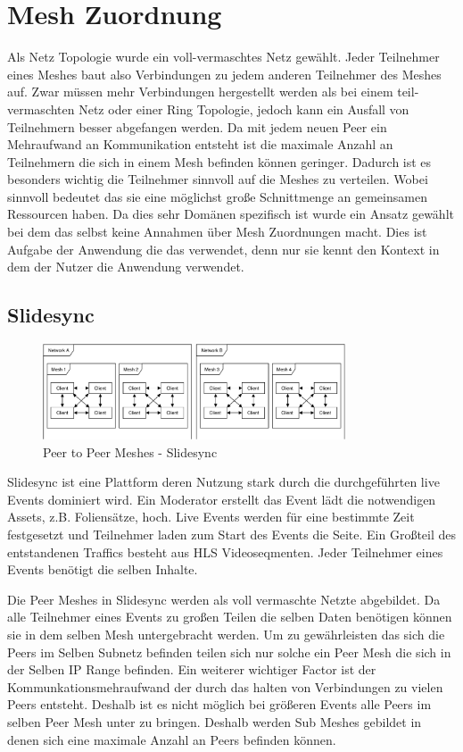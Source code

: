 \section{Mesh Zuordnung}
Als Netz Topologie wurde ein voll-vermaschtes Netz gewählt. Jeder Teilnehmer eines Meshes baut also Verbindungen zu jedem anderen Teilnehmer des Meshes auf. Zwar müssen mehr Verbindungen hergestellt werden als bei einem teil-vermaschten Netz oder einer Ring Topologie, jedoch kann ein Ausfall von Teilnehmern besser abgefangen werden. Da mit jedem neuen Peer ein Mehraufwand an Kommunikation entsteht ist die maximale Anzahl an Teilnehmern die sich in einem Mesh befinden können geringer. Dadurch ist es besonders wichtig die Teilnehmer sinnvoll auf die Meshes zu verteilen. Wobei sinnvoll bedeutet das sie eine möglichst große Schnittmenge an gemeinsamen Ressourcen haben. Da dies sehr Domänen spezifisch ist wurde ein Ansatz gewählt bei dem das \cdn selbst keine Annahmen über Mesh Zuordnungen macht. Dies ist Aufgabe der Anwendung die das \cdn verwendet, denn nur sie kennt den Kontext in dem der Nutzer die Anwendung verwendet. 

\subsection{Slidesync}
\begin{figure}[!h]
	\centering
	\includegraphics[width=0.8\textwidth]{figures/slidesync_peer_meshes}
	\caption[A Figure Short-Title]{Peer to Peer Meshes - Slidesync}
	\label{fig:mesh-slidesync}
\end{figure}

Slidesync ist eine Plattform deren Nutzung stark durch die durchgeführten live Events dominiert wird. Ein Moderator erstellt das Event lädt die notwendigen Assets, z.B. Foliensätze, hoch. Live Events werden für eine bestimmte Zeit festgesetzt und Teilnehmer laden zum Start des Events die Seite. Ein Großteil des entstandenen Traffics besteht aus HLS Videoseqmenten. Jeder Teilnehmer eines Events benötigt die selben Inhalte. 

Die Peer Meshes in Slidesync werden als voll vermaschte Netzte abgebildet. Da alle Teilnehmer eines Events zu großen Teilen die selben Daten benötigen können sie in dem selben Mesh untergebracht werden. Um zu gewährleisten das sich die Peers im Selben Subnetz befinden teilen sich nur solche ein Peer Mesh die sich in der Selben IP Range befinden. Ein weiterer wichtiger Factor ist der Kommunkationsmehraufwand der durch das halten von Verbindungen zu vielen Peers entsteht. Deshalb ist es nicht möglich bei größeren Events alle Peers im selben Peer Mesh unter zu bringen. Deshalb werden Sub Meshes gebildet in denen sich eine maximale Anzahl an Peers befinden können. 


